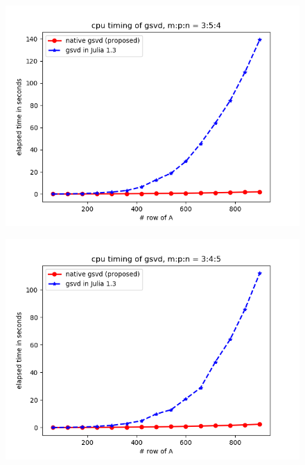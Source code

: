         \begin{figure}[H]
            \centering
            \begin{minipage}{.65\textwidth}
              \centering
              \includegraphics[width=\linewidth]{fig/m_p_n_3_5_4.png}
            \end{minipage}%
            
        \end{figure}
        
        \begin{figure}[H]
            \centering
            \begin{minipage}{.65\textwidth}
              \centering
              \includegraphics[width=\linewidth]{fig/m_p_n_3_4_5.png}
            \end{minipage}
            \label{cur_new_2}
        \end{figure}
        
